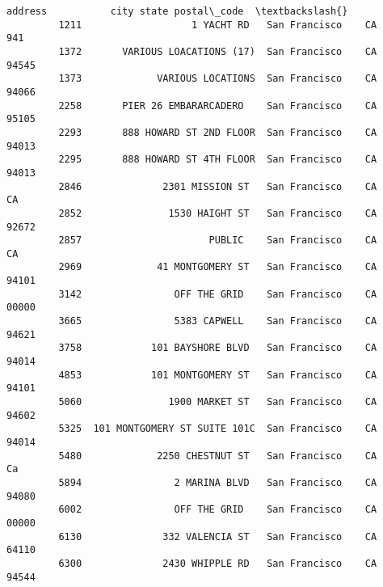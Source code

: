 \documentclass[11pt]{article}
\begin{document}
\begin{Verbatim}[commandchars=\\\{\}]
                                    address           city state postal\_code  \textbackslash{}
         1211                   1 YACHT RD   San Francisco    CA         941   
         1372       VARIOUS LOACATIONS (17)  San Francisco    CA       94545   
         1373             VARIOUS LOCATIONS  San Francisco    CA       94066   
         2258       PIER 26 EMBARARCADERO    San Francisco    CA       95105   
         2293       888 HOWARD ST 2ND FLOOR  San Francisco    CA       94013   
         2295       888 HOWARD ST 4TH FLOOR  San Francisco    CA       94013   
         2846              2301 MISSION ST   San Francisco    CA          CA   
         2852               1530 HAIGHT ST   San Francisco    CA       92672   
         2857                      PUBLIC    San Francisco    CA          CA   
         2969             41 MONTGOMERY ST   San Francisco    CA       94101   
         3142                OFF THE GRID    San Francisco    CA       00000   
         3665                5383 CAPWELL    San Francisco    CA       94621   
         3758            101 BAYSHORE BLVD   San Francisco    CA       94014   
         4853            101 MONTGOMERY ST   San Francisco    CA       94101   
         5060               1900 MARKET ST   San Francisco    CA       94602   
         5325  101 MONTGOMERY ST SUITE 101C  San Francisco    CA       94014   
         5480             2250 CHESTNUT ST   San Francisco    CA          Ca   
         5894                2 MARINA BLVD   San Francisco    CA       94080   
         6002                OFF THE GRID    San Francisco    CA       00000   
         6130              332 VALENCIA ST   San Francisco    CA       64110   
         6300              2430 WHIPPLE RD   San Francisco    CA       94544   
         

\end{Verbatim}
\end{document}
